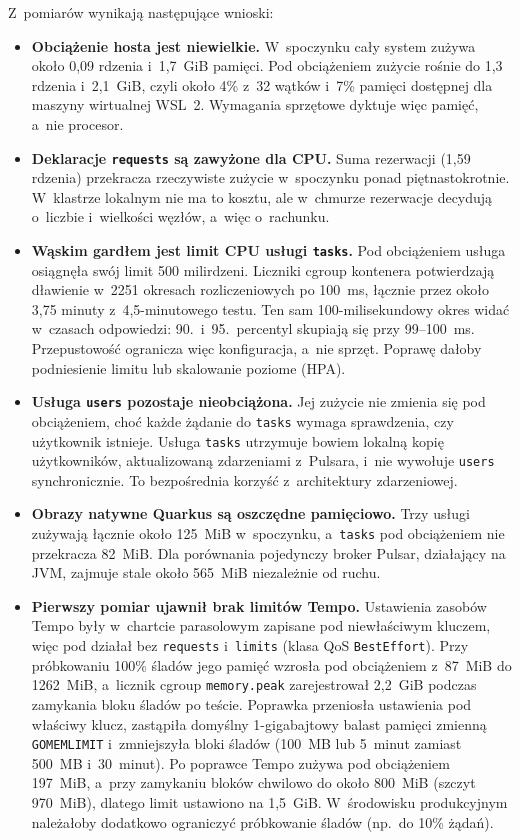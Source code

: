 Z~pomiarów wynikają następujące wnioski:
\begin{itemize}
    \item \textbf{Obciążenie hosta jest niewielkie.} W~spoczynku cały system zużywa około 0,09 rdzenia i~1,7~GiB pamięci. Pod obciążeniem zużycie rośnie do 1,3 rdzenia i~2,1~GiB, czyli około 4\% z~32 wątków i~7\% pamięci dostępnej dla maszyny wirtualnej WSL~2. Wymagania sprzętowe dyktuje więc pamięć, a~nie procesor.
    \item \textbf{Deklaracje \texttt{requests} są zawyżone dla CPU.} Suma rezerwacji (1,59 rdzenia) przekracza rzeczywiste zużycie w~spoczynku ponad piętnastokrotnie. W~klastrze lokalnym nie ma to kosztu, ale w~chmurze rezerwacje decydują o~liczbie i~wielkości węzłów, a~więc o~rachunku.
    \item \textbf{Wąskim gardłem jest limit CPU usługi \texttt{tasks}.} Pod obciążeniem usługa osiągnęła swój limit 500 milirdzeni. Liczniki cgroup kontenera potwierdzają dławienie w~2251 okresach rozliczeniowych po 100~ms, łącznie przez około 3,75 minuty z~4,5-minutowego testu. Ten sam 100-milisekundowy okres widać w~czasach odpowiedzi: 90.\ i~95.\ percentyl skupiają się przy 99--100~ms. Przepustowość ogranicza więc konfiguracja, a~nie sprzęt. Poprawę dałoby podniesienie limitu lub skalowanie poziome (HPA).
    \item \textbf{Usługa \texttt{users} pozostaje nieobciążona.} Jej zużycie nie zmienia się pod obciążeniem, choć każde żądanie do \texttt{tasks} wymaga sprawdzenia, czy użytkownik istnieje. Usługa \texttt{tasks} utrzymuje bowiem lokalną kopię użytkowników, aktualizowaną zdarzeniami z~Pulsara, i~nie wywołuje \texttt{users} synchronicznie. To bezpośrednia korzyść z~architektury zdarzeniowej.
    \item \textbf{Obrazy natywne Quarkus są oszczędne pamięciowo.} Trzy usługi zużywają łącznie około 125~MiB w~spoczynku, a~\texttt{tasks} pod obciążeniem nie przekracza 82~MiB. Dla porównania pojedynczy broker Pulsar, działający na JVM, zajmuje stale około 565~MiB niezależnie od ruchu.
    \item \textbf{Pierwszy pomiar ujawnił brak limitów Tempo.} Ustawienia zasobów Tempo były w~chartcie parasolowym zapisane pod niewłaściwym kluczem, więc pod działał bez \texttt{requests} i~\texttt{limits} (klasa QoS \texttt{BestEffort}). Przy próbkowaniu 100\% śladów jego pamięć wzrosła pod obciążeniem z~87~MiB do 1262~MiB, a~licznik cgroup \texttt{memory.peak} zarejestrował 2,2~GiB podczas zamykania bloku śladów po teście. Poprawka przeniosła ustawienia pod właściwy klucz, zastąpiła domyślny 1-gigabajtowy balast pamięci zmienną \texttt{GOMEMLIMIT} i~zmniejszyła bloki śladów (100~MB lub 5~minut zamiast 500~MB i~30~minut). Po poprawce Tempo zużywa pod obciążeniem 197~MiB, a~przy zamykaniu bloków chwilowo do około 800~MiB (szczyt 970~MiB), dlatego limit ustawiono na 1,5~GiB. W~środowisku produkcyjnym należałoby dodatkowo ograniczyć próbkowanie śladów (np.\ do 10\% żądań).

\end{itemize}
